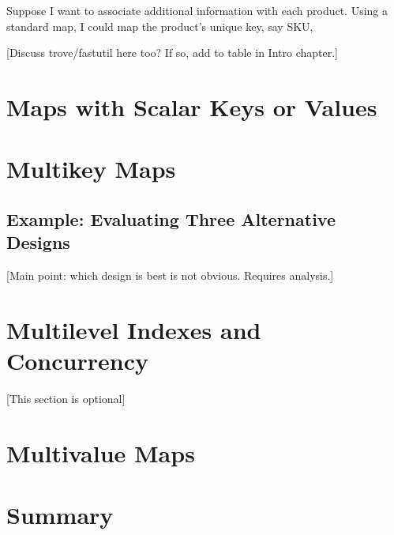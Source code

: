 Suppose I want to associate additional information with each product.  Using a
standard map, I could map the product's unique key, say SKU, 

[Discuss trove/fastutil here too?  If so, add to table in Intro chapter.]

\section{Maps with Scalar Keys or Values}
\label{sec:primitive-maps}

\section{Multikey Maps}
\subsection{Example: Evaluating Three Alternative Designs}
[Main point: which design is best is not obvious. Requires analysis.]

\section{Multilevel Indexes and Concurrency}
\label{sec:concurrency-multilevel-indexes}
[This section is optional]

\section{Multivalue Maps}

\section{Summary}




